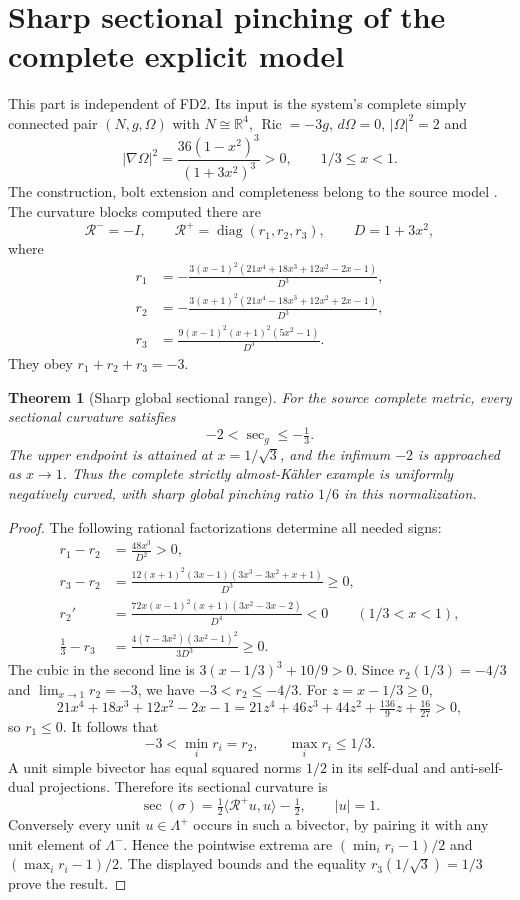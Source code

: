 \documentclass[11pt,a4paper]{article}
\newtheorem{theorem}{Theorem}[section]
\theoremstyle{definition}\newtheorem{assumption}[theorem]{Input}
\theoremstyle{remark}\newtheorem{remark}[theorem]{Remark}
\newcommand{\Ric}{\operatorname{Ric}}
\newcommand{\R}{\mathbb R}
\numberwithin{equation}{section}
\begin{document}
\section{Sharp sectional pinching of the complete explicit model}
This part is independent of FD2. Its input is the system's complete simply connected pair $(N,g,\Omega)$ with $N\cong\R^4$, $\Ric=-3g$, $d\Omega=0$, $|\Omega|^2=2$ and
\[
 |\nabla\Omega|^2=\frac{36(1-x^2)^3}{(1+3x^2)^3}>0,
 \qquad 1/3\le x<1.
\]
The construction, bolt extension and completeness belong to the source model \cite{ProjectFino,ProjectSubsequent}. The curvature blocks computed there are
\begin{equation}\label{Rblocks}
 \mathcal R^-=-I,\qquad \mathcal R^+=\operatorname{diag}(r_1,r_2,r_3),\qquad D=1+3x^2,
\end{equation}
where
\begin{align}
 r_1&=-\frac{3(x-1)^2(21x^4+18x^3+12x^2-2x-1)}{D^3},\\
 r_2&=-\frac{3(x+1)^2(21x^4-18x^3+12x^2+2x-1)}{D^3},\\
 r_3&=\frac{9(x-1)^2(x+1)^2(5x^2-1)}{D^3}.
\end{align}
They obey $r_1+r_2+r_3=-3$.

\begin{theorem}[Sharp global sectional range]\label{pinch}
For the source complete metric, every sectional curvature satisfies
\[
 \boxed{-2<\sec_g\le-\tfrac13.}
\]
The upper endpoint is attained at $x=1/\sqrt3$, and the infimum $-2$ is approached as $x\to1$. Thus the complete strictly almost-K\"ahler example is uniformly negatively curved, with sharp global pinching ratio $1/6$ in this normalization.
\end{theorem}
\begin{proof}
The following rational factorizations determine all needed signs:
\begin{align}
 r_1-r_2&=\frac{48x^3}{D^2}>0,\\
 r_3-r_2&=\frac{12(x+1)^2(3x-1)(3x^3-3x^2+x+1)}{D^3}\ge0,\\
 r_2'&=\frac{72x(x-1)^2(x+1)(3x^2-3x-2)}{D^4}<0
 \qquad(1/3<x<1),\\
 \tfrac13-r_3&=\frac{4(7-3x^2)(3x^2-1)^2}{3D^3}\ge0.
\end{align}
The cubic in the second line is $3(x-1/3)^3+10/9>0$. Since
$r_2(1/3)=-4/3$ and $\lim_{x\to1}r_2=-3$, we have
$-3<r_2\le-4/3$.
For $z=x-1/3\ge0$,
\[
21x^4+18x^3+12x^2-2x-1
=21z^4+46z^3+44z^2+\tfrac{136}{9}z+\tfrac{16}{27}>0,
\]
so $r_1\le0$. It follows that
\[
 -3<\min_i r_i=r_2,\qquad \max_i r_i\le1/3.
\]
A unit simple bivector has equal squared norms $1/2$ in its self-dual and anti-self-dual projections. Therefore its sectional curvature is
\[
 \sec(\sigma)=\tfrac12\langle\mathcal R^+u,u\rangle-\tfrac12,
 \qquad |u|=1.
\]
Conversely every unit $u\in\Lambda^+$ occurs in such a bivector, by pairing it with any unit element of $\Lambda^-$. Hence the pointwise extrema are $(\min_i r_i-1)/2$ and $(\max_i r_i-1)/2$. The displayed bounds and the equality $r_3(1/\sqrt3)=1/3$ prove the result.
\end{proof}
\end{document}
